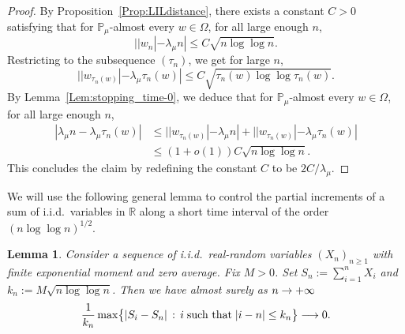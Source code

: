 \documentclass[10pt]{amsart}
\newtheorem{lemm}[theo]{Lemma}\newtheorem{prop}[theo]{Proposition}\newtheorem{coro}[theo]{Corollary}\newtheorem{conj}[theo]{Conjecture}
\theoremstyle{definition}\newtheorem{defi}[theo]{Definition}\newtheorem{rema}[theo]{Remark}\newtheorem{exam}[theo]{Example}\newtheorem{exem}[theo]{Example}\newtheorem{nota}[theo]{Notation}
\newcommand{\R}{\mathbb{R}}
\renewcommand{\Pr}{\mathbb{P}}
\renewcommand{\(}{\left(}
\renewcommand{\)}{\right)}
\renewcommand*{\to}{\mathchoice{\longrightarrow}{\rightarrow}{\rightarrow}{\rightarrow}}
\begin{document}
\begin{proof}
By Proposition~\ref{Prop:LILdistance}, there exists a constant $C> 0$ satisfying that for $\Pr_{\mu}$-almost every $w\in \Omega$, for all large enough $n$,
\[
||w_n|-\lambda_\mu n| \le C\sqrt{n \log \log n}.
\]
Restricting to the subsequence $(\tau_{n})$, we get for large $n$,
\[
||w_{\tau_n(w)}|-\lambda_\mu \tau_n(w)|\le C\sqrt{\tau_n(w) \log \log \tau_n(w)}.
\]
By Lemma~\ref{Lem:stopping_time-0}, we deduce that for $\Pr_{\mu}$-almost every $w\in \Omega$, for all large enough $n$,
\begin{align*}
|\lambda_\mu n-\lambda_\mu \tau_n(w)| &\le ||w_{\tau_n(w)}|-\lambda_\mu n| +||w_{\tau_n(w)}|-\lambda_\mu \tau_n(w)|\\
&\le (1+o(1))C\sqrt{n\log \log n}.
\end{align*}
This concludes the claim by redefining the constant $C$ to be $2C/\lambda_\mu$.
\end{proof}

We will use the following general lemma to control the partial increments of a sum of i.i.d.\ variables in $\R$ along a short time interval of the order $(n\log\log n)^{1/2}$.


\begin{lemm}\label{Lem:LDP}
Consider a sequence of i.i.d.\ real-random variables $(X_n)_{n\ge 1}$ with finite exponential moment and zero average. Fix $M>0$. Set $S_n:=\sum_{i=1}^n X_i$ and $k_n:=M\sqrt{n\log \log n}$. Then we have almost surely as $n \to+ \infty$
\[
\frac{1}{k_n}\max\bigl\{ |S_i-S_n| \,:\, i \;\text{such that} \; |i-n| \le k_n\bigr\}\to 0.
\]
\end{lemm}
\end{document}

